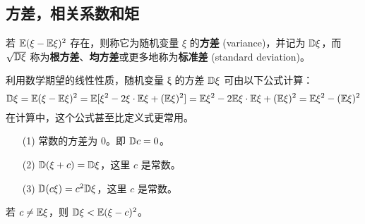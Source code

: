 \subsection{方差，相关系数和矩}\label{subsec:方差，相关系数和矩}
\begin{definition}[方差] \label{def:variance}
若 $\mathbb{E} (\xi-\mathbb{E}\xi)^2$ 存在，则称它为随机变量 $\xi$ 的\textbf{方差} (variance)，并记为 $\mathbb{D}\xi$，而 $\sqrt{\mathbb{D}\xi}$ 称为\textbf{根方差}、\textbf{均方差}或更多地称为\textbf{标准差} (standard deviation)。
\end{definition}
\begin{proposition} \label{prop:variance_calculation}
利用数学期望的线性性质，随机变量 ξ 的方差 $\mathbb{D}\xi$ 可由以下公式计算：
\begin{equation} \label{eq:variance_calculation_formula}
\mathbb{D}\xi = \mathbb{E} (\xi-\mathbb{E}\xi)^2 = \mathbb{E}[\xi^2 - 2\xi \cdot \mathbb{E}\xi + (\mathbb{E}\xi)^2] = \mathbb{E}\xi^2 - 2\mathbb{E}\xi \cdot \mathbb{E}\xi + (\mathbb{E}\xi)^2 = \mathbb{E}\xi^2 - (\mathbb{E}\xi)^2
\end{equation}
在计算中，这个公式甚至比定义式更常用。
\end{proposition}
\begin{proposition} \label{prop:variance_properties}
\begin{itemize}
    \item [(1)]常数的方差为 $0$。即 $\mathbb{D} c = 0$。
    \item [(2)]$\mathbb{D}(\xi+c) = \mathbb{D}\xi$，这里 $c$ 是常数。
    \item [(3)]$\mathbb{D}(c\xi) = c^2\mathbb{D}\xi$，这里 $c$ 是常数。
\end{itemize}
\end{proposition}
\begin{proposition} \label{prop:variance_minimal_property}
若 $c \ne \mathbb{E}\xi$，则 $\mathbb{D}\xi < \mathbb{E}(\xi-c)^2$。
\end{proposition}


